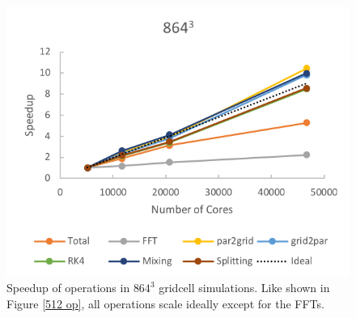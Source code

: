 \documentclass{article}
\begin{document}
\begin{figure}
  \begin{center}
    \includegraphics{pmpic_images/864.png}
  \end{center}
  \caption{Speedup of operations in $864^3$ gridcell simulations. Like shown in Figure \ref{512 op}, all operations scale ideally except for the FFTs.}
  \label{864 speedup}
\end{figure}
\end{document}
